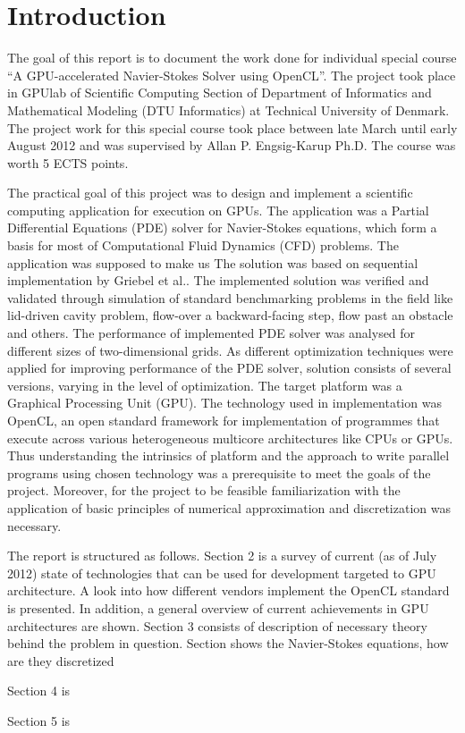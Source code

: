 \chapter{Introduction}
The goal of this report is to document the work done for individual special course \enquote{A GPU-accelerated Navier-Stokes Solver using OpenCL}. The project took place in GPUlab of Scientific Computing Section of Department of Informatics and Mathematical Modeling (DTU Informatics) at Technical University of Denmark. The project work for this special course took place between late March until early August 2012 and was supervised by Allan P. Engsig-Karup Ph.D. The course was worth 5 ECTS points.

The practical goal of this project was to design and implement a scientific computing application for execution on GPUs. The application was a Partial Differential Equations (PDE) solver for Navier-Stokes equations, which form a basis for most of Computational Fluid Dynamics (CFD) problems. The application was supposed to make us  The solution was based on sequential implementation by Griebel et al.\cite{griebel1998numerical}. The implemented solution was verified and validated through simulation of standard benchmarking problems in the field like lid-driven cavity problem, flow-over a backward-facing step, flow past an obstacle and others. The performance of implemented PDE solver was analysed for different sizes of two-dimensional grids. As different optimization techniques were applied for improving performance of the PDE solver, solution consists of several versions, varying in the level of optimization. The target platform was a Graphical Processing Unit (GPU). The technology used in implementation was OpenCL, an open standard framework for implementation of programmes that execute across various heterogeneous multicore architectures like CPUs or GPUs. Thus understanding the intrinsics of platform and the approach to write parallel programs using chosen technology was a prerequisite to meet the goals of the project. Moreover, for the project to be feasible familiarization with the application of basic principles of numerical approximation and discretization was necessary.

The report is structured as follows. Section 2 is a survey of current (as of July 2012) state of technologies that can be used for development targeted to GPU architecture. A look into how different vendors implement the OpenCL standard is presented. In addition, a general overview of current achievements in GPU architectures are shown. Section 3 consists of description of necessary theory behind the problem in question. Section shows the Navier-Stokes equations, how are they discretized  

Section 4 is

Section 5 is